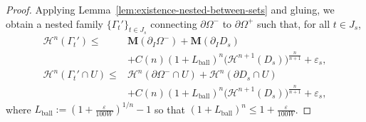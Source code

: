 \begin{lemma}
\begin{proof}
        Applying Lemma~\ref{lem:existence-nested-between-sets} and gluing, we obtain a nested family $\{\Gamma_t'\}_{t\in J_s}$ connecting $\partial\Omega^-$ to $\partial\Omega^+$ such that, for all $t\in J_s$,
        \begin{equation*}
            \begin{split}
                \mathcal{H}^n(\Gamma_t')
                \le& \mathbf{M}(\partial_I\Omega^-)
                   + \mathbf{M}(\partial_I D_s)\\
                   &+ C(n)(1+L_{\mathrm{ball}})^n\big(\mathcal{H}^{n+1}(D_s))^{\frac{n}{n+1}}
                   + \varepsilon_s,\\
                \mathcal{H}^n(\Gamma_t'\cap U)
                \le& \mathcal{H}^n(\partial\Omega^-\cap U)
                   + \mathcal{H}^n(\partial D_s\cap U)\\
                   &+ C(n)(1+L_{\mathrm{ball}})^n\big(\mathcal{H}^{n+1}(D_s))^{\frac{n}{n+1}}
                   + \varepsilon_s,
            \end{split}
        \end{equation*}
        where $L_{\mathrm{ball}}:=(1+\frac{\varepsilon}{100W})^{1/n}-1$ so that $(1+L_{\mathrm{ball}})^n\le 1+\frac{\varepsilon}{100W}$.    
        

\end{proof}
\end{lemma}
